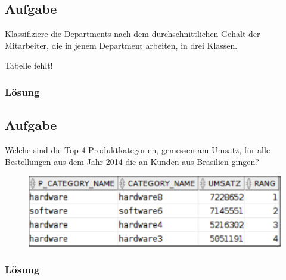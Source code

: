 \subsection{Aufgabe}
Klassifiziere die Departments nach dem durchschnittlichen Gehalt der Mitarbeiter, die in jenem Department arbeiten, in drei Klassen.

\begin{WARN}
  Tabelle fehlt!
\end{WARN}

\subsubsection*{Lösung}
\label{subsubsec:uebung_07.aufgabe_02.loesung}


\label{subsec:uebung_07.aufgabe_03}
\subsection{Aufgabe}
Welche sind die Top 4 Produktkategorien, gemessen am Umsatz, für alle Bestellungen aus dem Jahr 2014 die an Kunden aus Brasilien gingen?

\begin{figure}[H]
  \centering
  \includegraphics[width=1\textwidth]{img//uebung_07_-_aufgabe_03.png}
  \label{img:uebung_07_-_aufgabe_03}
\end{figure} 

\subsubsection*{Lösung}
\label{subsubsec:uebung_07.aufgabe_03.loesung}


\label{subsec:uebung_07.aufgabe_04}
